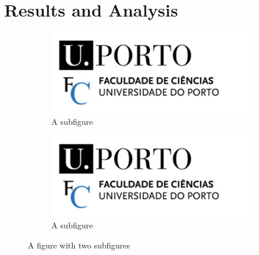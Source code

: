 \section{Results and Analysis}




\begin{figure}[!h]
    \centering
    \begin{subfigure}{.5\textwidth}
        \centering
        \includegraphics[width=.5\linewidth]{img/Cienciasporto.png}
        \caption{A subfigure}
        \label{fig:sub1}
    \end{subfigure}%
    \begin{subfigure}{.5\textwidth}
        \centering
        \includegraphics[width=.5\linewidth]{img/Cienciasporto.png}
        \caption{A subfigure}
        \label{fig:sub2}
    \end{subfigure}
    \caption{A figure with two subfigures}
    \label{fig:test}
\end{figure}
